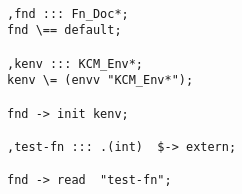 \begin{lstlisting}[caption={%
\emblink{\#lst--rz--\thelstlisting.pgvm-pdf}{Sample IDL Code}},
  numbers = none, escapechar = !,
  label={lst:rz},
    basicstyle = \ttfamily\bfseries\footnotesize,
 linewidth = 1.01\linewidth]

,fnd ::: Fn_Doc*;
fnd \== default;

,kenv ::: KCM_Env*;
kenv \= (envv "KCM_Env*");

fnd -> init kenv;

,test-fn ::: .(int)  $-> extern;

fnd -> read  "test-fn";


\end{lstlisting}


